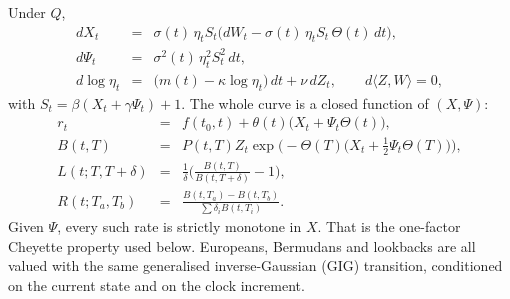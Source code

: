 \documentclass[12pt,a4paper,final]{article}
\theoremstyle{plain}
\begin{document}
Under $Q$,
\begin{eqnarray}
dX_t&=&\sigma(t)\,\eta_t S_t
\Biggl(dW_t-\sigma(t)\,\eta_t S_t\,\Theta(t)\,dt\Biggr),\\
d\Psi_t&=&\sigma^{2}(t)\,\eta_t^{2} S_t^{2}\,dt,\\
d\log\eta_t
&=&\bigl(m(t)-\kappa\log\eta_t\bigr)\,dt+\nu\,dZ_t,
\qquad d\langle Z,W\rangle=0,
\end{eqnarray}
with $S_t=\beta(X_t+\gamma\Psi_t)+1$. The whole curve is a closed function
of $(X,\Psi)$:
\begin{eqnarray*}
r_t
&=&
f(t_0,t)+\theta(t)\bigl(X_t+\Psi_t\Theta(t)\bigr),\\
B(t,T)
&=&
P(t,T)Z_t\exp\Biggl(
-\Theta(T)\Biggl(X_t+\frac12\Psi_t\Theta(T)\Biggr)
\Biggr),\\
L(t;T,T+\delta)
&=&
\frac{1}{\delta}\Biggl(\frac{B(t,T)}{B(t,T+\delta)}-1\Biggr),\\
R(t;T_a,T_b)
&=&
\frac{B(t,T_a)-B(t,T_b)}{\sum\delta_i B(t,T_i)}.
\end{eqnarray*}
Given $\Psi$, every such rate is strictly monotone in $X$. That is the
one-factor Cheyette property used below. Europeans, Bermudans and
lookbacks are all valued with the same generalised inverse-Gaussian
(GIG) transition, conditioned on the current state and on the clock
increment.
\end{document}
